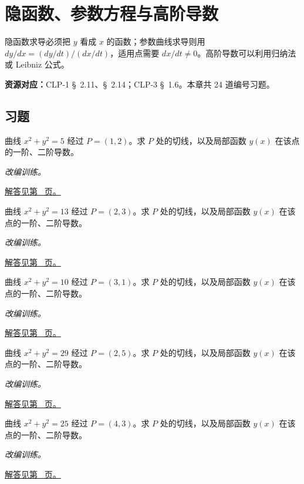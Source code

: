 \documentclass[12pt,fontset=fandol]{ctexart}
\begin{document}
\clearpage
\section{隐函数、参数方程与高阶导数}\label{sec:ch9}
隐函数求导必须把 $y$ 看成 $x$ 的函数；参数曲线求导则用 $dy/dx=(dy/dt)/(dx/dt)$，适用点需要 $dx/dt\ne0$。高阶导数可以利用归纳法或 Leibniz 公式。

\textbf{资源对应：}CLP-1 \S~2.11、\S~2.14；CLP-3 \S~1.6。本章共 24 道编号习题。
\subsection{习题}
\begin{example}[圆的隐函数导数]\label{ex:c9q1}
曲线 $x^2+y^2=5$ 经过 $P=(1,2)$。求 $P$ 处的切线，以及局部函数 $y(x)$ 在该点的一阶、二阶导数。
\par\textit{改编训练。}\par\hyperref[ans:c9q1]{解答见第~\pageref{ans:c9q1} 页。}
\end{example}
\begin{example}[圆的隐函数导数]\label{ex:c9q2}
曲线 $x^2+y^2=13$ 经过 $P=(2,3)$。求 $P$ 处的切线，以及局部函数 $y(x)$ 在该点的一阶、二阶导数。
\par\textit{改编训练。}\par\hyperref[ans:c9q2]{解答见第~\pageref{ans:c9q2} 页。}
\end{example}
\begin{example}[圆的隐函数导数]\label{ex:c9q3}
曲线 $x^2+y^2=10$ 经过 $P=(3,1)$。求 $P$ 处的切线，以及局部函数 $y(x)$ 在该点的一阶、二阶导数。
\par\textit{改编训练。}\par\hyperref[ans:c9q3]{解答见第~\pageref{ans:c9q3} 页。}
\end{example}
\begin{example}[圆的隐函数导数]\label{ex:c9q4}
曲线 $x^2+y^2=29$ 经过 $P=(2,5)$。求 $P$ 处的切线，以及局部函数 $y(x)$ 在该点的一阶、二阶导数。
\par\textit{改编训练。}\par\hyperref[ans:c9q4]{解答见第~\pageref{ans:c9q4} 页。}
\end{example}
\begin{example}[圆的隐函数导数]\label{ex:c9q5}
曲线 $x^2+y^2=25$ 经过 $P=(4,3)$。求 $P$ 处的切线，以及局部函数 $y(x)$ 在该点的一阶、二阶导数。
\par\textit{改编训练。}\par\hyperref[ans:c9q5]{解答见第~\pageref{ans:c9q5} 页。}
\end{example}
\end{document}
